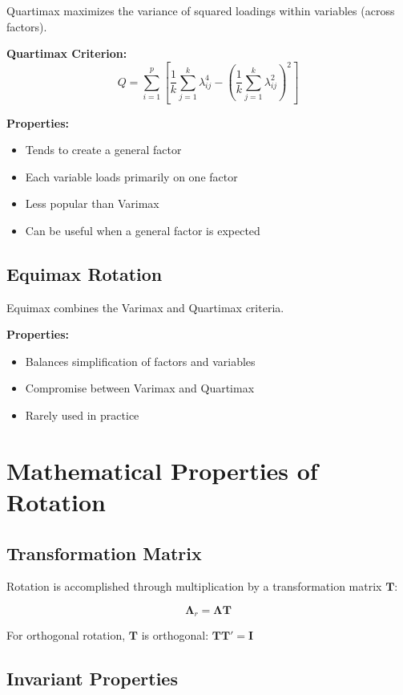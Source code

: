 \documentclass[a4paper]{tufte-book}
\begin{document}
Quartimax maximizes the variance of squared loadings within variables (across factors).

\textbf{Quartimax Criterion:}
$$Q = \sum_{i=1}^{p} \left[ \frac{1}{k}\sum_{j=1}^{k} \lambda_{ij}^4 - \left(\frac{1}{k}\sum_{j=1}^{k} \lambda_{ij}^2\right)^2 \right]$$

\textbf{Properties:}
\begin{itemize}
\item Tends to create a general factor
\item Each variable loads primarily on one factor
\item Less popular than Varimax
\item Can be useful when a general factor is expected
\end{itemize}

\subsection{Equimax Rotation}

Equimax combines the Varimax and Quartimax criteria.

\textbf{Properties:}
\begin{itemize}
\item Balances simplification of factors and variables
\item Compromise between Varimax and Quartimax
\item Rarely used in practice
\end{itemize}

\section{Mathematical Properties of Rotation}

\subsection{Transformation Matrix}

Rotation is accomplished through multiplication by a transformation matrix $\mathbf{T}$:

$$\boldsymbol{\Lambda}_r = \boldsymbol{\Lambda}\mathbf{T}$$

For orthogonal rotation, $\mathbf{T}$ is orthogonal: $\mathbf{T}\mathbf{T}' = \mathbf{I}$

\subsection{Invariant Properties}
\end{document}
